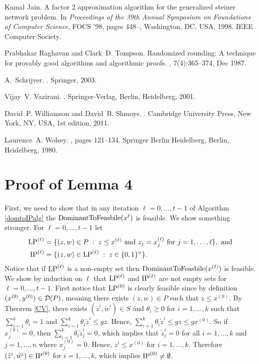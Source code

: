 \documentclass[runningheads]{llncs}
\begin{document}
\begin{thebibliography}{10}
	Kamal Jain.
	\newblock A factor 2 approximation algorithm for the generalized steiner
	network problem.
	\newblock In {\em Proceedings of the 39th Annual Symposium on Foundations of
		Computer Science}, FOCS '98, pages 448--, Washington, DC, USA, 1998. IEEE
	Computer Society.
	
	Prabhakar Raghavan and Clark~D. Tompson.
	\newblock Randomized rounding: A technique for provably good algorithms and
	algorithmic proofs.
	, 7(4):365--374, Dec 1987.
	
	A.~Schrijver.
	.
	\newblock Springer, 2003.
	
	Vijay~V. Vazirani.
	.
	\newblock Springer-Verlag, Berlin, Heidelberg, 2001.
	
	David~P. Williamson and David~B. Shmoys.
	.
	\newblock Cambridge University Press, New York, NY, USA, 1st edition, 2011.
	
	Laurence~A. Wolsey.
	,
	pages 121--134.
	\newblock Springer Berlin Heidelberg, Berlin, Heidelberg, 1980.
	
\end{thebibliography}

\appendix
\section{Proof of Lemma 4}\label{lemma4}
	First, we need to show that in any iteration $\ell=  0,\ldots,t-1$ of Algorithm \ref{domtoIPalg} the $\operatorname{DominantToFeasbile}(x^{\ell})$ is feasible. We show something stronger. For $\ell=0,\ldots,t-1$ let
	\begin{align*}
	\operatorname{LP}^{(\ell)}&= \{(z,w)\in P\; : \; z\leq x^{(\ell)} \mbox{ and } z_j=x_j^{(\ell)} \mbox{ for } j=1,\ldots,\ell\}, \text{ and}\\
	\operatorname{IP}^{(\ell)}&= \{(z,w)\in \operatorname{LP}^{(\ell)}\; : \; z\in \{0,1\}^n\}.
	\end{align*}
	Notice that if $\operatorname{LP}^{(\ell)}$ is a non-empty set then $\operatorname{DominantToFeasbile}(x^{(\ell)})$ is feasible. We show by induction on $\ell$ that $\operatorname{LP}^{(\ell)}$ and $\operatorname{IP}^{(\ell)}$ are not empty sets for $\ell=0,\ldots,t-1$. First notice that $\operatorname{LP}^{(0)}$ is clearly feasible since by definition $(x^{(0)},y^{(0)})\in \operatorname{\mathcal{D}}(P)$, meaning there exists $(z,w)\in P$ such that $z\leq x^{(0)}$. By Theorem \ref{CV}, there exists $(\tilde{z}^i,\tilde{w}^i) \in S$ and $\theta_i\geq 0$ for $i=1,\ldots,k$ such that $\sum_{i=1}^{k} \theta_i = 1$ and $\sum_{i=1}^{k}\theta_i \tilde{z}^i \leq gz$. Hence, $\sum_{i=1}^{k}\theta_i \tilde{z}^i \leq gz\leq gx^{(0)}$. So if $x^{(0)}_j=0$, then $ \sum_{i=1}^{k}\theta_i \tilde{z}_j^i =0$, which implies that $\tilde{z}^i_j=0$ for all $i=1,\ldots,k$ and $j= 1,\ldots,n$ where $x^{(0)}_j=0$. Hence, $z^i\leq x^{(0)}$ for $i=1,\ldots,k$. Therefore $(\tilde{z}^i,\tilde{w}^i)\in \operatorname{IP}^{(0)}$ for $i=1,\ldots,k$, which implies $\operatorname{IP}^{(0)}\neq \emptyset$.
	
\end{document}
